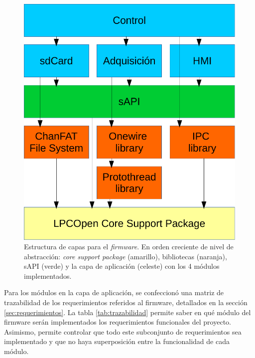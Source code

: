\begin{figure}[ht]
	\centering
	\includegraphics[width=.55\textwidth]{./Figures/capas.pdf}
	\caption[Estructura de capas para el \textit{firmware}.]{Estructura de capas para el \textit{firmware}. En orden creciente de nivel de abstracción: \textit{core support package} (amarillo), bibliotecas (naranja), sAPI (verde) y la capa de aplicación (celeste) con los 4 módulos implementados.}
	\label{fig:capas}
\end{figure}

\vspace{10px}

Para los módulos en la capa de aplicación, se confeccionó una matriz de trazabilidad de los requerimientos referidos al firmware, detallados en la sección \ref{sec:requerimientos}. La tabla \ref{tab:trazabilidad} permite saber en qué módulo del firmware serán implementados los requerimientos funcionales del proyecto.  Asimismo, permite controlar que todo este subconjunto de requerimientos sea implementado y que no haya superposición entre la funcionalidad de cada módulo.

\vspace{10px}

